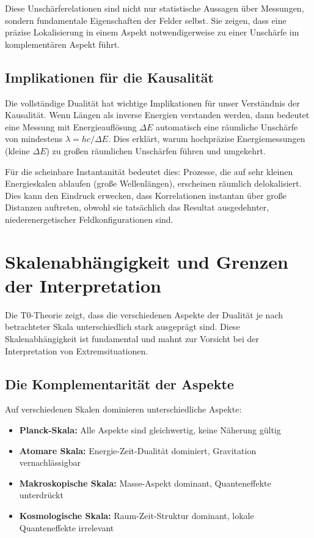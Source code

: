 	Diese Unschärferelationen sind nicht nur statistische Aussagen über Messungen, sondern fundamentale Eigenschaften der Felder selbst. Sie zeigen, dass eine präzise Lokalisierung in einem Aspekt notwendigerweise zu einer Unschärfe im komplementären Aspekt führt.
	
	\subsection{Implikationen für die Kausalität}
	
	Die vollständige Dualität hat wichtige Implikationen für unser Verständnis der Kausalität. Wenn Längen als inverse Energien verstanden werden, dann bedeutet eine Messung mit Energieauflösung $\Delta E$ automatisch eine räumliche Unschärfe von mindestens $\lambda = hc/\Delta E$. Dies erklärt, warum hochpräzise Energiemessungen (kleine $\Delta E$) zu großen räumlichen Unschärfen führen und umgekehrt.
	
	Für die scheinbare Instantanität bedeutet dies: Prozesse, die auf sehr kleinen Energieskalen ablaufen (große Wellenlängen), erscheinen räumlich delokalisiert. Dies kann den Eindruck erwecken, dass Korrelationen instantan über große Distanzen auftreten, obwohl sie tatsächlich das Resultat ausgedehnter, niederenergetischer Feldkonfigurationen sind.
	
	\section{Skalenabhängigkeit und Grenzen der Interpretation}
	
	Die T0-Theorie zeigt, dass die verschiedenen Aspekte der Dualität je nach betrachteter Skala unterschiedlich stark ausgeprägt sind. Diese Skalenabhängigkeit ist fundamental und mahnt zur Vorsicht bei der Interpretation von Extremsituationen.
	
	\subsection{Die Komplementarität der Aspekte}
	
	Auf verschiedenen Skalen dominieren unterschiedliche Aspekte:
	\begin{itemize}
		\item \textbf{Planck-Skala:} Alle Aspekte sind gleichwertig, keine Näherung gültig
		\item \textbf{Atomare Skala:} Energie-Zeit-Dualität dominiert, Gravitation vernachlässigbar
		\item \textbf{Makroskopische Skala:} Masse-Aspekt dominant, Quanteneffekte unterdrückt
		\item \textbf{Kosmologische Skala:} Raum-Zeit-Struktur dominant, lokale Quanteneffekte irrelevant
	\end{itemize}
	
